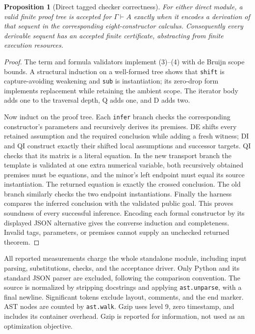 \documentclass[11pt,letterpaper]{article}
\newtheorem{proposition}[theorem]{Proposition}
\theoremstyle{definition}\newtheorem{definition}[theorem]{Definition}
\theoremstyle{remark}\newtheorem{remark}[theorem]{Remark}
\newcommand{\file}[1]{\texttt{\nolinkurl{#1}}}
\newcommand{\code}[1]{\texttt{#1}}
\begin{document}
\begin{proposition}[Direct tagged checker correctness]
For either direct module, a valid finite proof tree is accepted for
\(\Gamma\vdash A\) exactly when it encodes a derivation of that sequent
in the corresponding eight-constructor calculus. Consequently every
derivable sequent has an accepted finite certificate, abstracting from
finite execution resources.
\end{proposition}
\begin{proof}
The term and formula validators implement (3)--(4) with de Bruijn scope
bounds. A structural induction on a well-formed tree shows that
\code{shift} is capture-avoiding weakening and \code{sub} is instantiation;
its zero-drop form implements replacement while retaining the ambient
scope. The iterator body adds one to the traversal depth, Q adds one,
and D adds two.

Now induct on the proof tree. Each \code{infer} branch checks the
corresponding constructor's parameters and recursively derives its
premises. DE shifts every retained assumption and the required conclusion
while adding a fresh witness; DI and QI construct exactly their shifted
local assumptions and successor targets. QI checks that its matrix is a
literal equation. In the new transport branch the template is validated
at one extra numerical variable, both recursively obtained premises must
be equations, and the minor's left endpoint must equal its source
instantiation. The returned equation is exactly the crossed conclusion.
The old branch similarly checks the two endpoint instantiations.
Finally the harness compares the inferred conclusion with the validated
public goal. This proves soundness of every successful inference.
Encoding each formal constructor by its displayed JSON alternative gives
the converse induction and completeness. Invalid tags, parameters, or
premises cannot supply an unchecked returned theorem.
\end{proof}

All reported measurements charge the whole standalone module, including
input parsing, substitutions, checks, and the acceptance driver. Only
Python and its standard JSON parser are excluded, following the comparison
convention. The source is normalized by stripping docstrings and applying
\file{ast.unparse}, with a final newline. Significant tokens exclude
layout, comments, and the end marker. AST nodes are counted by
\file{ast.walk}. Gzip uses level 9, zero timestamp, and includes its
container overhead. Gzip is reported for information, not used as an
optimization objective.
\end{document}
